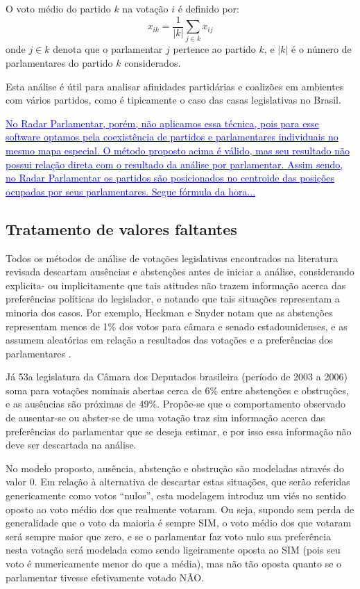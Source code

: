 \documentclass[a4paper, 12pt]{article}
\newcommand{\ins}[1]{\textcolor{blue}{\uline{#1}}} %
\begin{document}
O voto médio do partido $k$ na votação $i$ é definido por:
\begin{equation}
  x_{ik} = \frac{1}{|k|}\sum_{j\in k} x_{ij}
  \label{eq:voto-partido}
\end{equation}
onde $j \in k$ denota que o parlamentar $j$ pertence ao partido $k$, e $|k|$ é o número de parlamentares do partido $k$ considerados.

Esta análise é útil para analisar afinidades partidárias e coalizões em ambientes com vários partidos, como é tipicamente o caso das casas legislativas no Brasil.

\ins{No Radar Parlamentar, porém, não aplicamos essa técnica, pois para esse software optamos pela coexistência de partidos e parlamentares individuais no mesmo mapa especial. O método proposto acima é válido, mas seu resultado não possui relação direta com o resultado da análise por parlamentar. Assim sendo, no Radar Parlamentar os partidos são posicionados no centroide das posições ocupadas por seus parlamentares. Segue fórmula da hora...}

\subsection*{Tratamento de valores faltantes}

Todos os métodos de análise de votações legislativas encontrados na literatura revisada descartam ausências e abstenções antes de iniciar a análise, considerando explicita- ou implicitamente que tais atitudes não trazem informação acerca das preferências políticas do legislador, e notando que tais situações representam a minoria dos casos. Por exemplo, Heckman e Snyder notam que as abstenções representam menos de 1\% dos votos para câmara e senado estadounidenses, e as assumem aleatórias em relação a resultados das votações e a preferências dos parlamentares \cite[p.40]{heckman-snyder1997}.

Já 53a legislatura da Câmara dos Deputados brasileira (período de 2003 a 2006) soma para votações nominais abertas cerca de 6\% entre abstenções e obstruções, e as ausências são próximas de 49\%. Propõe-se que o comportamento observado de ausentar-se ou abster-se de uma votação traz sim informação acerca das preferências do parlamentar que se deseja estimar, e por isso essa informação não deve ser descartada na análise.

No modelo proposto, ausência, abstenção e obstrução são modeladas através do valor 0. Em relação à alternativa de descartar estas situações, que serão referidas genericamente como votos ``nulos'', esta modelagem introduz um viés no sentido oposto ao voto médio dos que realmente votaram. Ou seja, supondo sem perda de generalidade que o voto da maioria é sempre SIM, o voto médio dos que votaram será sempre maior que zero, e se o parlamentar faz voto nulo sua preferência nesta votação será modelada como sendo ligeiramente oposta ao SIM (pois seu voto é numericamente menor do que a média), mas não tão oposta quanto se o parlamentar tivesse efetivamente votado NÃO.
\end{document}

